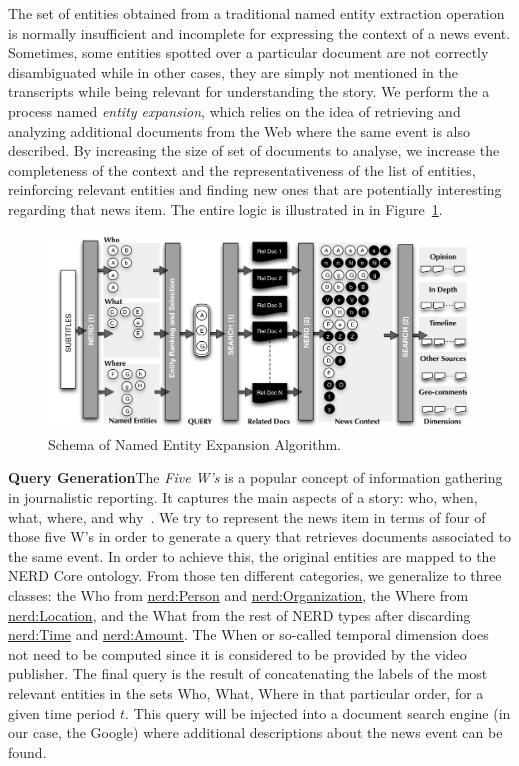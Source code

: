 \documentclass{llncs}
\begin{document}
The set of entities obtained from a traditional named entity extraction operation is normally insufficient and incomplete for expressing the context of a news event. Sometimes, some entities spotted over a particular document are not correctly disambiguated while in other cases, they are simply not mentioned in the transcripts while being relevant for understanding the story. We perform the a process named \emph{entity expansion}, which relies on the idea of retrieving and analyzing additional documents from the Web where the same event is also described. By increasing the size of set of documents to analyse, we increase the completeness of the context and the representativeness of the list of entities, reinforcing relevant entities and finding new ones that are potentially interesting regarding that news item. The entire logic is illustrated in in Figure~\ref{fig:namedEntityExpansion}.

\begin{figure}[t!]
\centering
\includegraphics[width=1\textwidth]{figure/ExpansionDiagram}
\caption{Schema of Named Entity Expansion Algorithm.}
\label{fig:namedEntityExpansion}%
\end{figure}

\textbf{Query Generation}The \emph{Five W's} is a popular concept of information gathering in journalistic reporting. It captures the main aspects of a story: who, when, what, where, and why~\cite{LiJia2007}. We try to represent the news item in terms of four of those five W's in order to generate a query that retrieves documents associated to the same event. In order to achieve this, the original entities are mapped to the NERD Core ontology. From those ten different categories, we generalize to three classes: the Who from \url{nerd:Person} and \url{nerd:Organization}, the Where from \url{nerd:Location}, and the What from the rest of NERD types after discarding \url{nerd:Time} and \url{nerd:Amount}. The When or so-called temporal dimension does not need to be computed since it is considered to be provided by the video publisher. The final query is the result of concatenating the labels of the most relevant entities in the sets Who, What, Where in that particular order, for a given time period $t$.  
This query will be injected into a document search engine (in our case, the Google) where additional descriptions about the news event can be found.
\end{document}
